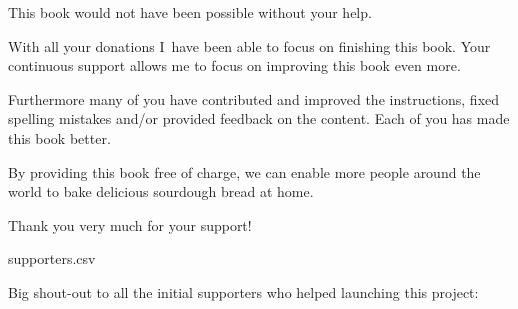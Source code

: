 This book would not have been possible without your help.

With all your donations I~have been able to focus on finishing
this book. Your continuous support allows me to focus
on improving this book even more.

Furthermore many of you have contributed and improved the
instructions, fixed spelling mistakes and/or provided
feedback on the content. Each of you has made this book
better.

By providing this book free of charge,
we can enable more people around the world to bake delicious sourdough
bread at home.

Thank you very much for your support!\\

\begin{filecontents}{supporters.csv}
  \end{filecontents}

  {Big shout-out to all the initial supporters who helped launching this project:}


